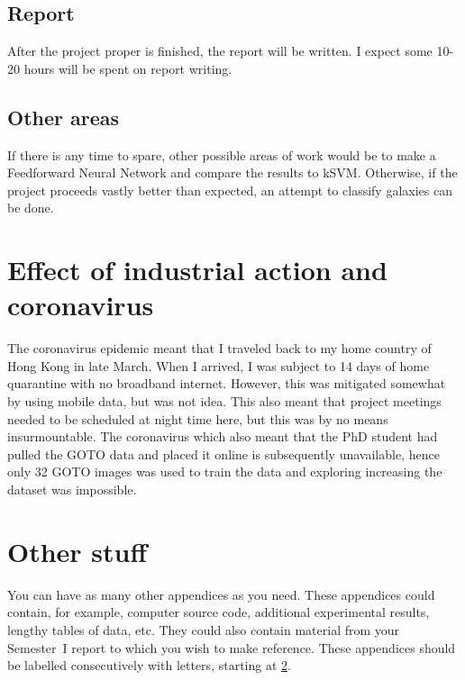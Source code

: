 \documentclass[a4paper,fleqn,usenatbib]{mnras}
\begin{document}
\subsection{Report}
After the project proper is finished, the report will be written. I expect some 10-20 hours will be spent on report writing.
\subsection{Other areas}
If there is any time to spare, other possible areas of work would be to make a Feedforward Neural Network and compare the results to kSVM. Otherwise, if the project proceeds vastly better than expected, an attempt to classify galaxies can be done.

\section{Effect of industrial action and coronavirus}
\label{2020 special}
The coronavirus epidemic meant that I traveled back to my home country of Hong Kong in late March. When I arrived, I was subject to 14 days of home quarantine with no broadband internet. However, this was mitigated somewhat by using mobile data, but was not idea. This also meant that project meetings needed to be scheduled at night time here, but this was by no means insurmountable. The coronavirus which also meant that the PhD student had pulled the GOTO data and placed it online is subsequently unavailable, hence only 32 GOTO images was used to train the data and exploring increasing the dataset was impossible. 


\section{Other stuff}
\label{other appendices}
You can have as many other appendices as you need. These appendices could contain, for example, computer source code, additional experimental results, lengthy tables of data, etc.  They could also contain material from your Semester~I report to which you wish to make reference. These appendices should be labelled consecutively with letters, starting at \ref{other appendices}.




\bsp	%
\label{lastpage}
\end{document}
